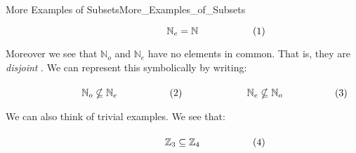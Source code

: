 \begin{lexample}{More Examples of Subsets}{More_Examples_of_Subsets}
\begin{subequations}
\begin{minipage}[b]{0.49\textwidth}
                \end{minipage}
                \hfill
                \begin{minipage}[b]{0.49\textwidth}
                    \begin{equation}
                        \mathbb{N}_{e}=\mathbb{N}
                    \end{equation}
                \end{minipage}
            \end{subequations}
            \par\vspace{2.5ex}
            Moreover we see that $\mathbb{N}_{o}$ and $\mathbb{N}_{e}$ have no
            elements in common. That is, they are \textit{disjoint}%
            . We can represent this symbolically by
            writing:
            \par\hfill\par
            \begin{subequations}
                \begin{minipage}[b]{0.49\textwidth}
                    \begin{equation}
                        \mathbb{N}_{o}\nsubseteq\mathbb{N}_{e}
                    \end{equation}
                \end{minipage}
                \hfill
                \begin{minipage}[b]{0.49\textwidth}
                    \begin{equation}
                        \mathbb{N}_{e}\nsubseteq\mathbb{N}_{o}
                    \end{equation}
                \end{minipage}
            \end{subequations}
            \par\vspace{2.5ex}
            We can also think of trivial examples. We see that:
            \par\hfill\par
            \begin{subequations}
                \begin{minipage}[b]{0.49\textwidth}
                    \begin{equation}
                        \mathbb{Z}_{3}\subseteq\mathbb{Z}_{4}
                    \end{equation}
                \end{minipage}

\end{subequations}
\end{lexample}
